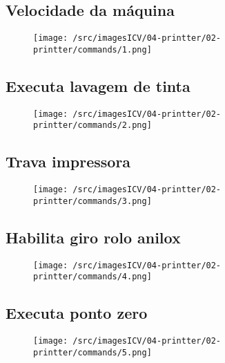 \newpage
\thispagestyle{fancy}
\vspace{\fill}
\subsection{Velocidade da máquina}
\begin{figure}
    \centering
    \texttt{[image: /src/imagesICV/04-printter/02-printter/commands/1.png]}
\end{figure}

\newpage
\thispagestyle{fancy}
\vspace{\fill}
\subsection{Executa lavagem de tinta}
\begin{figure}
    \centering
    \texttt{[image: /src/imagesICV/04-printter/02-printter/commands/2.png]}
\end{figure}

\newpage
\thispagestyle{fancy}
\vspace{\fill}
\subsection{Trava impressora}
\begin{figure}
    \centering
    \texttt{[image: /src/imagesICV/04-printter/02-printter/commands/3.png]}
\end{figure}

\newpage
\thispagestyle{fancy}
\vspace{\fill}
\subsection{Habilita giro rolo anilox}
\begin{figure}
    \centering
    \texttt{[image: /src/imagesICV/04-printter/02-printter/commands/4.png]}
\end{figure}

\newpage
\thispagestyle{fancy}
\vspace{\fill}
\subsection{Executa ponto zero}
\begin{figure}
    \centering
    \texttt{[image: /src/imagesICV/04-printter/02-printter/commands/5.png]}
\end{figure}

